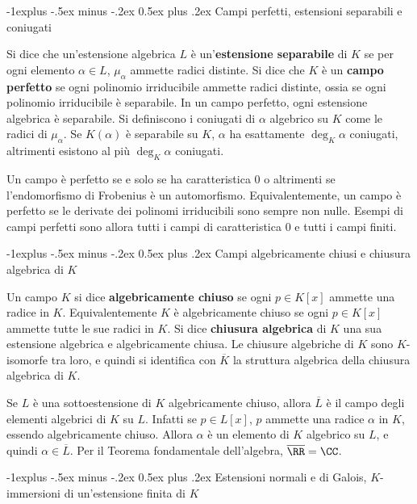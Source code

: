 \documentclass[10pt,landscape]{article}
\makeatletter
\renewcommand{\subsection}{\@startsection{subsection}{2}{0mm}%
	{-1explus -.5ex minus -.2ex}%
	{0.5ex plus .2ex}%
	{\normalfont\normalsize\bfseries}}
\makeatother
\begin{document}
\begin{multicols}{3}
		
		\subsection{Campi perfetti, estensioni separabili e coniugati}
		
		
		Si dice che un'estensione algebrica $L$ è un'\textbf{estensione separabile} di
		$K$ se per ogni elemento $\alpha \in L$,
		$\mu_\alpha$ ammette radici distinte. Si dice
		che $K$ è un \textbf{campo perfetto} se ogni
		polinomio irriducibile ammette radici distinte,
		ossia se ogni polinomio irriducibile è separabile.
		In un campo perfetto, ogni estensione algebrica
		è separabile. Si definiscono i coniugati di
		$\alpha$ algebrico su $K$ come le radici
		di $\mu_\alpha$. Se $K(\alpha)$ è separabile su $K$,
		$\alpha$ ha esattamente $\deg_K \alpha$ coniugati,
		altrimenti esistono al più $\deg_K \alpha$ coniugati. \medskip
		
		
		Un campo è perfetto se e solo se ha caratteristica
		$0$ o altrimenti se l'endomorfismo di
		Frobenius è un automorfismo. Equivalentemente,
		un campo è perfetto se le derivate dei polinomi
		irriducibili sono sempre non nulle. Esempi di
		campi perfetti sono allora tutti i campi di
		caratteristica $0$ e tutti i campi finiti. 
		
		
		\subsection{Campi algebricamente chiusi e chiusura algebrica di $K$}
		
		Un campo $K$ si dice \textbf{algebricamente chiuso} se
		ogni $p \in K[x]$ ammette una radice in $K$. Equivalentemente $K$ è algebricamente chiuso se
		ogni $p \in K[x]$ ammette tutte le sue radici in $K$.
		Si dice \textbf{chiusura algebrica} di $K$
		una sua estensione algebrica e algebricamente
		chiusa. Le chiusure algebriche di $K$ sono
		$K$-isomorfe tra loro, e quindi si identifica
		con $\overline{K}$ la struttura algebrica della
		chiusura algebrica di $K$. \medskip
		
		
		Se $L$ è una sottoestensione di $K$ algebricamente
		chiuso, allora $\overline{L}$ è il campo degli
		elementi algebrici di $K$ su $L$. Infatti se
		$p \in L[x]$, $p$ ammette una radice $\alpha$ in $K$, essendo
		algebricamente chiuso. Allora $\alpha$ è un elemento
		di $K$ algebrico su $L$, e quindi $\alpha \in \overline{L}$. Per il Teorema fondamentale dell'algebra,
		$\overline{\RR} = \CC$.
		
		
		\subsection{Estensioni normali e di Galois, $K$-immersioni di un'estensione finita di $K$}
		

\end{multicols}
\end{document}

